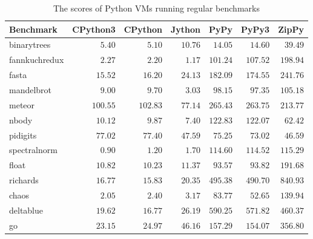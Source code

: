 \begin{table}
  \small
  \begin{center}
  \begin{tabular}{ l r r r r r r }
  \toprule
  Benchmark     & CPython3  & CPython  & Jython  & PyPy     & PyPy3    & ZipPy \\
  \midrule
  \textsf{binarytrees}   & $5.40$    & $5.10$   & $10.76$ & $14.05$  & $14.60$  & $39.49$ \\
  \textsf{fannkuchredux} & $2.27$    & $2.20$   & $1.17$  & $101.24$ & $107.52$ & $198.94$ \\
  \textsf{fasta}         & $15.52$   & $16.20$  & $24.13$ & $182.09$ & $174.55$ & $241.76$ \\
  \textsf{mandelbrot}    & $9.00$    & $9.70$   & $3.03$  & $98.15$  & $97.35$  & $105.18$ \\
  \textsf{meteor}        & $100.55$  & $102.83$ & $77.14$ & $265.43$ & $263.75$ & $213.77$ \\
  \textsf{nbody}         & $10.12$   & $9.87$   & $7.40$  & $122.83$ & $122.07$ & $62.42$ \\
  \textsf{pidigits}      & $77.02$   & $77.40$  & $47.59$ & $75.25$  & $73.02$  & $46.59$ \\
  \textsf{spectralnorm}  & $0.90$    & $1.20$   & $1.70$  & $114.60$ & $114.52$ & $115.29$ \\
  \textsf{float}         & $10.82$   & $10.23$  & $11.37$ & $93.57$  & $93.82$  & $191.68$ \\
  \textsf{richards}      & $16.77$   & $15.83$  & $20.35$ & $495.38$ & $490.70$ & $840.93$ \\
  \textsf{chaos}         & $2.05$    & $2.40$   & $3.17$  & $83.77$  & $52.65$  & $139.94$ \\
  \textsf{deltablue}     & $19.62$   & $16.77$  & $26.19$ & $590.25$ & $571.82$ & $460.37$ \\
  \textsf{go}            & $23.15$   & $24.97$  & $46.16$ & $157.29$ & $154.07$ & $356.80$ \\
  \bottomrule
  \end{tabular}
  \caption{The scores of Python VMs running regular benchmarks}
  \label{tab:ch6-regular-benchmarks-scores}
  \end{center}
\end{table}

